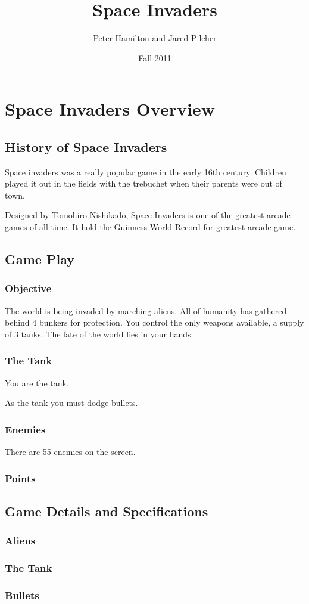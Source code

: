 \documentclass[11pt,letter,oneside]{report}
\begin{document}
\title{Space Invaders}
\author{Peter Hamilton and Jared Pilcher}
\date{Fall 2011}
\maketitle

\tableofcontents

\chapter{Space Invaders Overview}
\section{History of Space Invaders}

Space invaders was a really popular game in the early 16th century.  Children played it out in the fields with the trebuchet when their parents were out of town.

Designed by Tomohiro Nishikado, Space Invaders is one of the greatest arcade games of all time.  It hold the Guinness World Record for greatest arcade game.
 

\section{Game Play}

\subsection{Objective}

The world is being invaded by marching aliens.  All of humanity has gathered behind 4 bunkers for protection.  You control the only weapons available, a supply of 3 tanks.  The fate of the world lies in your hands.

\subsection{The Tank}

You are the tank.

As the tank you must dodge bullets.

\subsection{Enemies}

There are 55 enemies on the screen.

\subsection{Points}

\section{Game Details and Specifications}

\subsection{Aliens}

\subsection{The Tank}

\subsection{Bullets}
\end{document}
